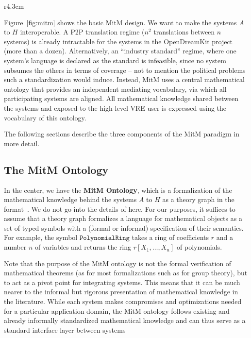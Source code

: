 \begin{wrapfigure}r{4.3cm}\vspace*{-2em}
  \vspace*{-1em}
  \caption{MitM Paradigm}\label{fig:mitm}\vspace*{-1.5em}
\end{wrapfigure}
Figure~\ref{fig:mitm} shows the basic MitM design.
We want to make the systems $A$ to $H$ interoperable.
A P2P translation regime ($n^2$ translations between $n$ systems) is already intractable for the systems in the OpenDreamKit project (more than a dozen).
Alternatively, an ``industry standard'' regime, where one system's language is declared as the standard is infeasible, since no system subsumes the others in terms of coverage -- not to mention the political problems such a standardization would induce.
Instead, MitM uses a central mathematical ontology that provides an independent mediating vocabulary, via which all participating systems are aligned.
All mathematical knowledge shared between the systems and exposed to the high-level VRE user is expressed using the vocabulary of this ontology.

The following sections describe the three components of the MitM paradigm in more detail.

\subsection{The MitM Ontology}\label{sec:mitm:recap}

In the center, we have the \textbf{MitM Ontology}, which is a formalization of
the mathematical knowledge behind the systems $A$ to $H$ as a theory graph in
the \OMMT format~\cite{Kohlhase:OMDoc1.2,RabKoh:WSMSML13,uniformal:on}. We do
not go into the details of \OMMT here. For our purposes, it
suffices to assume that a theory graph formalizes a language for mathematical objects as a set of typed symbols with a (formal or informal) specification of their semantics.
For example, the symbol $\mathtt{PolynomialRing}$ takes a ring of coefficients $r$ and a number $n$ of variables and returns the ring $r[X_1,\ldots,X_n]$ of polynomials.

Note that the purpose of the MitM ontology is not the formal verification of
mathematical theorems (as for most formalizations such as
\cite{Gonthier+:mcpoot13} for group theory), but to act as a pivot point for
integrating systems. This means that it can be much nearer to the informal but
rigorous presentation of mathematical knowledge in the literature. While each
system makes compromises and optimizations needed for a particular application
domain, the MitM ontology follows existing and already informally standardized
mathematical knowledge and can thus serve as a standard interface layer between
systems

